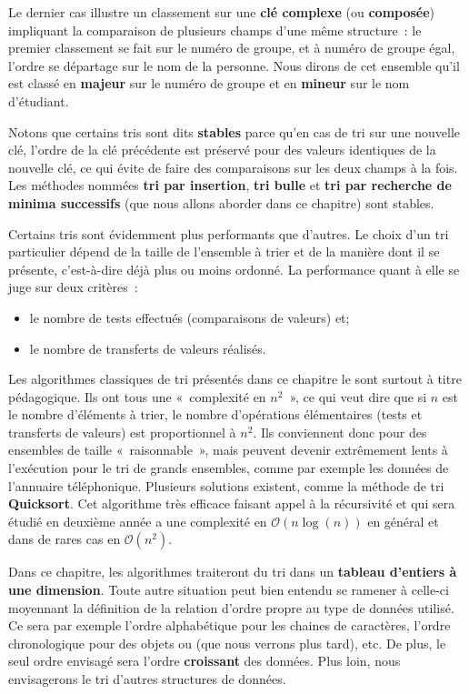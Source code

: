 	Le dernier cas illustre un classement sur une \textbf{clé complexe}
	(ou \textbf{composée}) impliquant la comparaison de plusieurs champs
	d’une même structure~: le premier classement se fait sur le numéro de
	groupe, et à numéro de groupe égal, l’ordre se départage sur le nom de
	la personne. Nous dirons de cet ensemble qu’il est classé en \textbf{majeur}
	sur le numéro de groupe et en \textbf{mineur} sur le nom d’étudiant.

	Notons que certains tris sont dits \textbf{stables} parce qu’en cas de tri
	sur une nouvelle clé, l’ordre de la clé précédente est préservé pour des
	valeurs identiques de la nouvelle clé, ce qui évite de faire des
	comparaisons sur les deux champs à la fois. Les méthodes nommées \textbf{tri
	par insertion}, \textbf{tri bulle} et \textbf{tri par recherche de minima
	successifs} (que nous allons aborder dans ce chapitre) sont stables.

	Certains tris sont évidemment plus performants que d’autres. Le choix d’un
	tri particulier dépend de la taille de l’ensemble à trier et de la manière
	dont il se présente, c’est-à-dire déjà plus ou moins ordonné.  La
	performance quant à elle se juge sur deux critères~: 
	\begin{itemize}
		\item le nombre de tests effectués (comparaisons de valeurs) et;
		\item le nombre de transferts de valeurs réalisés. 
	\end{itemize}
	
	
	Les algorithmes classiques de tri présentés dans ce chapitre le sont
	surtout à titre pédagogique. Ils ont tous une «~complexité en $n^2$~», ce
	qui veut dire que si $n$ est le nombre d’éléments à trier, le nombre
	d’opérations élémentaires (tests et transferts de valeurs) est
	proportionnel à $n^2$. Ils conviennent donc pour des ensembles de taille
	«~raisonnable~», mais peuvent devenir extrêmement lents à l’exécution pour
	le tri de grands ensembles, comme par exemple les données de l’annuaire
	téléphonique. Plusieurs solutions existent, comme la méthode de tri
	\textbf{Quicksort}. Cet algorithme très efficace faisant appel à la
	récursivité et qui sera étudié en deuxième année a une complexité en
	$\mathcal{O}(n \log(n))$ en général et dans de rares cas en
	$\mathcal{O}(n^2)$. 

	
	Dans ce chapitre, les algorithmes traiteront du tri dans un \textbf{tableau
	d’entiers à une dimension}. Toute autre situation peut bien entendu se
	ramener à celle-ci moyennant la définition de la relation d’ordre propre au
	type de données utilisé. Ce sera par exemple l’ordre alphabétique pour les
	chaines de caractères, l’ordre chronologique pour des objets  ou
	 (que nous verrons plus tard), etc. De plus, le seul ordre
	envisagé sera l’ordre \textbf{croissant} des données. Plus loin, nous
	envisagerons le tri d’autres structures de données.

